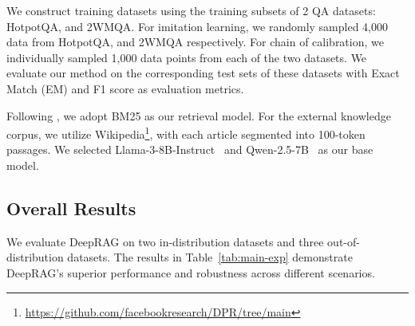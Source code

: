 
We construct training datasets using the training subsets of 2 QA datasets: HotpotQA, and 2WMQA. 
For imitation learning, we randomly sampled 4,000 data from HotpotQA, and 2WMQA respectively. 
For chain of calibration, we individually sampled 1,000 data points from each of the two datasets.
We evaluate our method on the corresponding test sets of these datasets with Exact Match (EM) and F1 score as evaluation metrics. 

Following \citet{su-etal-2024-dragin}, we adopt BM25 as our retrieval model. 
For the external knowledge corpus, we utilize Wikipedia\footnote{\url{https://github.com/facebookresearch/DPR/tree/main}}, with each article segmented into 100-token passages. 
We selected Llama-3-8B-Instruct~\cite{dubey2024llama} and Qwen-2.5-7B~\cite{qwen2} as our base model.


\subsection{Overall Results}
We evaluate DeepRAG on two in-distribution datasets and three out-of-distribution datasets. The results in Table~\ref{tab:main-exp} demonstrate DeepRAG's superior performance and robustness across different scenarios.


